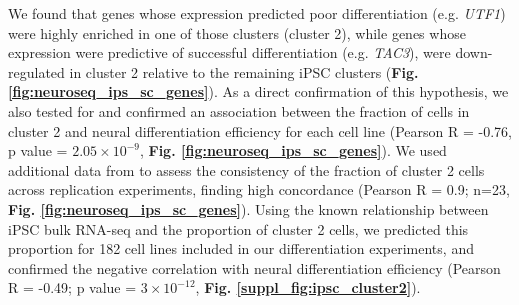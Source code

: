 We found that genes whose expression predicted poor differentiation (e.g. \textit{UTF1}) were highly enriched in one of those clusters (cluster 2), while genes whose expression were predictive of successful differentiation (e.g. \textit{TAC3}), were down-regulated in cluster 2 relative to the remaining iPSC clusters (\textbf{Fig. \ref{fig:neuroseq_ips_sc_genes}}). 
As a direct confirmation of this hypothesis, we also tested for and confirmed an association between the fraction of cells in cluster 2 and neural differentiation efficiency for each cell line (Pearson R = -0.76, p value = $2.05 \times 10^{-9}$, \textbf{Fig. \ref{fig:neuroseq_ips_sc_genes}}). 
We used additional data from \cite{cuomo2020single} to assess the consistency of the fraction of cluster 2 cells across replication experiments, finding high concordance (Pearson R = 0.9; n=23, \textbf{Fig. \ref{fig:neuroseq_ips_sc_genes}}).
Using the known relationship between iPSC bulk RNA-seq and the proportion of cluster 2 cells, we predicted this proportion for 182 cell lines included in our differentiation experiments, and confirmed the negative correlation with neural differentiation efficiency (Pearson R = -0.49; p value = $3 \times 10^{-12}$, \textbf{Fig. \ref{suppl_fig:ipsc_cluster2}}). 
\\

